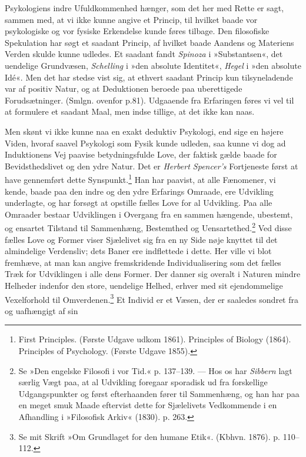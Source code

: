 \documentclass[12pt,a4paper,openany]{book}
\newcommand{\opage}[1]{\marginnote{\footnotesize\textit{[#1]}}}
\begin{document}
Psykologiens indre Ufuldkommenhed hænger, som det her med Rette er sagt,
sammen med, at vi ikke kunne angive et Princip, til hvilket baade vor
psykologiske og vor fysiske Erkendelse kunde føres tilbage. Den
filosofiske Spekulation har søgt et saadant Princip, af hvilket baade
Aandens og Materiens Verden skulde kunne udledes. Et saadant fandt
\emph{Spinoza} i »Substantsen«, det uendelige Grundvæsen,
\emph{Schelling} i »den absolute Identitet«, \emph{Hegel} i »den
absolute Idé«. Men det har stedse vist sig, at ethvert saadant Princip
kun tilsyneladende var af positiv Natur, og at Deduktionen beroede paa
uberettigede Forudsætninger. (Smlgn. ovenfor p.81). Udgaaende fra
Erfaringen føres vi vel til at formulere et saadant Maal, men indse
tillige, at det ikke kan naas.

Men skønt vi ikke kunne naa en exakt deduktiv Psykologi, end sige en
højere Viden, hvoraf saavel Psykologi som Fysik kunde udleden, saa kunne
vi dog ad Induktionens Vej paavise betydningsfulde Love, der faktisk
gælde baade for Bevidsthedslivet og den ydre Natur. Det er
\emph{Herbert Spencer’s} Fortjeneste først at have gennemført dette
Synspunkt.\footnote[1]{First Principles. (Første Udgave udkom 1861).
Principles of Biology (1864). Principles of Psychology. (Første Udgave
1855).} Han har paavist, at alle Fænomener, vi kende, baade paa den
indre og den ydre Erfarings Omraade, ere Udvikling underlagte, og har
forsøgt at opstille fælles Love for al Udvikling. Paa alle Omraader
bestaar Udviklingen i Overgang fra en sammen%
\opage{102}hængende, ubestemt, og ensartet Tilstand til Sammenhæng,
Bestemthed og Uensartethed.\footnote[1]{Se »Den engelske Filosofi i vor
Tid.« p. 137--139. --- Hos os har \emph{Sibbern} lagt særlig Vægt paa, at
al Udvikling foregaar sporadisk ud fra forskellige Udgangspunkter og
først efterhaanden fører til Sammenhæng, og han har paa en meget smuk
Maade eftervist dette for Sjælelivets Vedkommende i en Afhandling i
»Filosofisk Arkiv« (1830). p. 263.} Ved disse fælles Love og Former
viser Sjælelivet sig fra en ny Side nøje knyttet til det almindelige
Verdensliv; dets Baner ere indflettede i dette. Her ville vi blot
fremhæve, at man kan angive fremskridende Individualisering som det
fælles Træk for Udviklingen i alle dens Former. Der danner sig overalt i
Naturen mindre Helheder indenfor den store, uendelige Helhed, erhver med
sit ejendommelige Vexelforhold til Omverdenen.\footnote[2]{Se mit Skrift
»Om Grundlaget for den humane Etik«. (Kbhvn. 1876). p. 110--112.} Et
Individ er et Væsen, der er saaledes sondret fra og uafhængigt af sin
\end{document}
